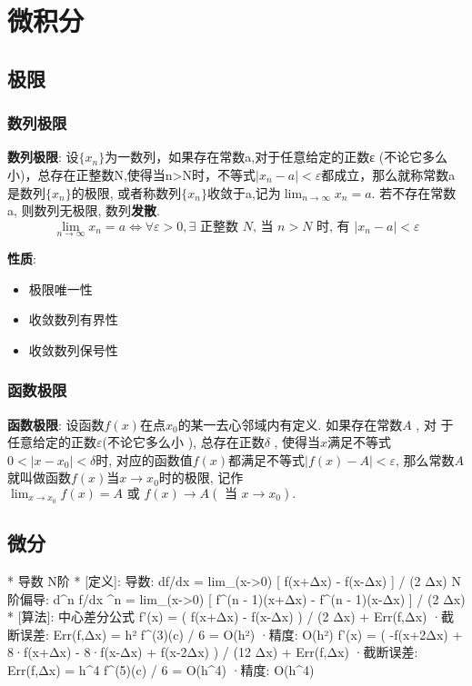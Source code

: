\documentclass{article}
\title{}\date{} \setlength{\parindent}{0pt} \linespread{1.25}
\begin{document}
\tableofcontents

\section{微积分}
	\subsection{极限}
		\subsubsection{数列极限}
			\textbf{数列极限}: 设$\{x_n\}$为一数列，如果存在常数a,对于任意给定的正数ε (不论它多么小)，总存在正整数N,使得当n>N时，不等式$\left|x_{n}-a\right|<\varepsilon$都成立，那么就称常数a是数列$\{x_n\}$的极限, 或者称数列$\{x_n\}$收敛于a,记为$\lim _{n \rightarrow \infty} x_{n}=a$. 若不存在常数a, 则数列无极限, 数列\textbf{发散}.
				$$\lim _{n \rightarrow \infty} x_{n}=a \Leftrightarrow \forall \varepsilon>0, \exists \text { 正整数 } N \text {, 当 } n>N \text { 时, 有 }\left|x_{n}-a\right|<\varepsilon$$

				\textbf{性质}: 
					\begin{itemize}
						\item 极限唯一性
						\item 收敛数列有界性
						\item 收敛数列保号性

					\end{itemize}

		\subsubsection{函数极限}
			\textbf{函数极限}: 设函数$f(x)$在点$x_{0}$的某一去心邻域内有定义. 如果存在常数$A$ , 对 于任意给定的正数$\varepsilon$(不论它多么小 ), 总存在正数$\delta$ , 使得当$x$满足不等式$0<\left|x-x_{0}\right|<\delta$时, 对应的函数值$f(x)$都满足不等式$|f(x)-A|<\varepsilon$, 那么常数$A$就叫做函数$f(x)$当$x \rightarrow x_{0}$时的极限, 记作$\lim _{x \rightarrow x_{0}} f(x)=A \text { 或 } f(x) \rightarrow A\left(\text { 当 } x \rightarrow x_{0}\right) .$

		
		

    \subsection{微分}
    *                    导数  N阶
    *	[定义]:
            导数: df/dx = lim_(x->0)  [ f(x+Δx) - f(x-Δx) ] / (2 Δx)
            N阶偏导:
                  d^n f/dx ^n = lim_(x->0)  [ f^(n - 1)(x+Δx) - f^(n - 1)(x-Δx) ] / (2 Δx)
    *	[算法]: 中心差分公式
            f'(x) = ( f(x+Δx) -  f(x-Δx) ) / (2 Δx) + Err(f,Δx)
            ·截断误差: Err(f,Δx) = h² f^(3)(c) / 6 = O(h²)
            ·精度: O(h²)
            f'(x) = ( -f(x+2Δx) + 8·f(x+Δx) - 8·f(x-Δx) + f(x-2Δx) ) / (12 Δx) + Err(f,Δx)
            ·截断误差: Err(f,Δx) = h^4 f^(5)(c) / 6 = O(h^4)
            ·精度: O(h^4)
\end{document}
